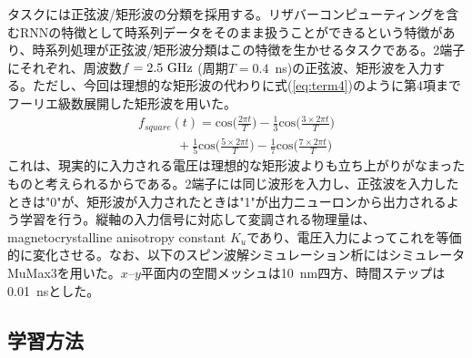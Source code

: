 \documentclass[a4j, twocolumn]{jsarticle}
\begin{document}
タスクには正弦波/矩形波の分類を採用する。リザバーコンピューティングを含むRNNの特徴として時系列データをそのまま扱うことができるという特徴があり、時系列処理が正弦波/矩形波分類はこの特徴を生かせるタスクである。2端子にそれぞれ、周波数$f=2.5~\rm{GHz}$ (周期$T=0.4$~ns)の正弦波、矩形波を入力する。ただし、今回は理想的な矩形波の代わりに式(\ref{eq:term4})のように第4項までフーリエ級数展開した矩形波を用いた。
\begin{eqnarray}
	f_{square}(t) = \mathrm{cos}\biggl( \frac{2{\pi}t}{T}\biggr)-\frac{1}{3}\mathrm{cos}\biggl(\frac{3\times2{\pi}t}{T}\biggr) \nonumber \\
	\quad\quad\quad  +\frac{1}{5}\mathrm{cos}\biggl(\frac{5\times2{\pi}t}{T}\biggr)-\frac{1}{7}\mathrm{cos} \biggl(\frac{7\times2{\pi}t}{T}\biggr)
\label{eq:term4}
\end{eqnarray}
これは、現実的に入力される電圧は理想的な矩形波よりも立ち上がりがなまったものと考えられるからである。2端子には同じ波形を入力し、正弦波を入力したときは"0"が、矩形波が入力されたときは"1"が出力ニューロンから出力されるよう学習を行う。縦軸の入力信号に対応して変調される物理量は、magnetocrystalline anisotropy constant $K_{u}$であり、電圧入力によってこれを等価的に変化させる。なお、以下のスピン波解シミュレーション析にはシミュレータMuMax3を用いた\cite{Vansteenkiste2014AIP:_the_desig_and_verif_of_MuMax}。$x$--$y$平面内の空間メッシュは10~nm四方、時間ステップは0.01~nsとした。

\subsection{学習方法}
\label{subsec:learning}
\end{document}
